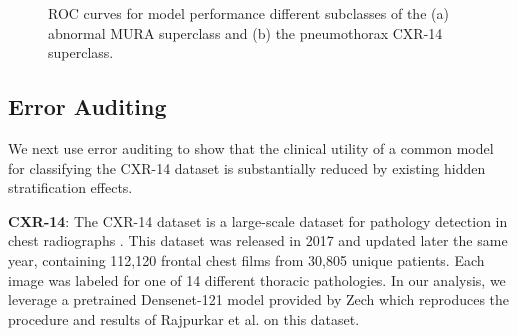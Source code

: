 \documentclass{article}
\begin{document}
 \begin{figure}[htb!]%
 \vspace{-3mm}
\centering
{}%
\caption{ROC curves for model performance different subclasses of the (a) abnormal MURA superclass and (b) the pneumothorax CXR-14 superclass.}
\label{fig:rocs}
\end{figure}


\subsection{Error Auditing}

We next use error auditing to show that the clinical utility of a common model for classifying the CXR-14 dataset is substantially reduced by existing hidden stratification effects.

\textbf{CXR-14}: The CXR-14 dataset is a large-scale dataset for pathology detection in chest radiographs \citep{Wang2017-vm}. 
This dataset was released in 2017 and updated later the same year, containing 112,120 frontal chest films from 30,805 unique patients. 
Each image was labeled for one of 14 different thoracic pathologies.  
In our analysis, we leverage a pretrained Densenet-121 model provided by Zech \citep{Zech_undated-cw} which reproduces the procedure and results of Rajpurkar et al. \citep{Rajpurkar2018-gc} on this dataset.  
\end{document}
